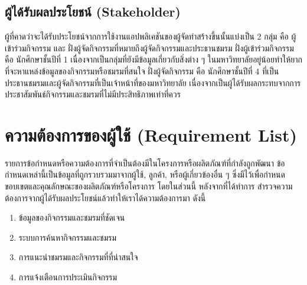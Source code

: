 \documentclass[14pt,oneside,openright,a4paper]{cpe-thai-project}
\begin{document}
\subsection{ผู้ได้รับผลประโยชน์ (Stakeholder)}
  ผู้ที่คาดว่าจะได้รับประโยชน์จากการใช้งานแอปพลิเคชันของผู้จัดทำสร้างขึ้นนั้นแบ่งเป็น 2 กลุ่ม คือ ผู้เข้าร่วมกิจกรรม และ ฝั่งผู้จัดกิจกรรมที่หมายถึงผู้จัดกิจกรรมและประธานชมรม
  ฝั่งผู้เข้าร่วมกิจกรรม คือ นักศึกษาชั้นปีที่ 1 เนื่องจากเป็นกลุ่มที่ยังมีข้อมูลเกี่ยวกับสิ่งต่าง ๆ ในมหาวิทยาลัยอยู่น้อยทำให้ยากที่จะหาแหล่งข้อมูลของกิจกรรมหรือชมรมที่สนใจ
  ฝั่งผู้จัดกิจกรรม คือ นักศึกษาชั้นปีที่ 4 ที่เป็นประธานชมรมและผู้จัดกิจกรรมที่เป็นเจ้าหน้าที่ของมหาวิทยาลัย เนื่องจากเป็นผู้ได้รับผลกระทบจากการประชาสัมพันธ์กิจกรรมและชมรมที่ไม่มีประสิทธิภาพเท่าที่ควร

\newpage

\section{ความต้องการของผู้ใช้ (Requirement List)}
  รายการข้อกำหนดหรือความต้องการที่จำเป็นต้องมีในโครงการหรือผลิตภัณฑ์ที่กำลังถูกพัฒนา ข้อกำหนดเหล่านี้เป็นข้อมูลที่ถูกรวบรวมมาจากผู้ใช้, ลูกค้า, หรือผู้เกี่ยวข้องอื่น ๆ ซึ่งมีไว้เพื่อกำหนดขอบเขตและคุณลักษณะของผลิตภัณฑ์หรือโครงการ โดยในส่วนนี้ หลังจากที่ได้ทำการ สำรวจความต้องการจากผู้ได้รับผลประโยชน์แล้วทำให้เราได้ความต้องการมา ดังนี้ \\

\begin{enumerate}
  \item ข้อมูลของกิจกรรมและชมรมที่ชัดเจน
  \item ระบบการค้นหากิจกรรมและชมรม
  \item การแนะนำชมรมและกิจกรรมที่ที่น่าสนใจ
  \item การแจ้งเตือนการประเมินกิจกรรม
\end{enumerate}
\end{document}
